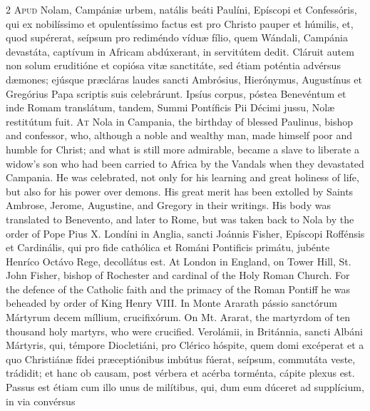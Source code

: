 \begin{paracol}{2}
\lettrine[lines=2]{A}{pud} Nolam, Campániæ 
 urbem, natális beáti Paulíni, Epíscopi et Confessóris, qui ex nobilíssimo et 
 opulentíssimo factus est pro Christo pauper et húmilis, et, quod supérerat, 
 seípsum pro rediméndo víduæ fílio, quem Wándali, Campánia devastáta, 
 captívum in Africam abdúxerant, in servitútem dedit. Cláruit autem non 
 solum eruditióne et copiósa vitæ sanctitáte, sed étiam poténtia advérsus 
 dæmones; ejúsque præcláras laudes sancti Ambrósius, Hierónymus, Augustínus 
 et Gregórius Papa scriptis suis celebrárunt. Ipsíus corpus, póstea 
 Benevéntum et inde Romam translátum, tandem, Summi Pontíficis Pii Décimi 
 jussu, Nolæ restitútum fuit.
\switchcolumn
{}
\lettrine[lines=2]{A}{t} Nola in Campania, the birthday of 
 blessed Paulinus, bishop and confessor, who, although a noble and wealthy 
 man, made himself poor and humble for Christ; and what is still more 
 admirable, became a slave to liberate a widow's son who had been carried to 
 Africa by the Vandals when they devastated Campania. He was 
 celebrated, not only for his learning and great holiness of life, but also 
 for his power over demons. His great merit has been extolled by Saints 
 Ambrose, Jerome, Augustine, and Gregory in their writings. His body 
 was translated to Benevento, and later to Rome, but was taken back to Nola 
 by the order of Pope Pius X.
\switchcolumn*
{}
Londíni in Anglia, 
 sancti Joánnis Fisher, Epíscopi Roffénsis et Cardinális, qui pro fide 
 cathólica et Románi Pontificis primátu, jubénte Henríco Octávo Rege, 
 decollátus est.
\switchcolumn
{}
At London in England, on Tower Hill, 
 St. John Fisher, bishop of Rochester and cardinal of the Holy Roman Church. 
 For the defence of the Catholic faith and the primacy of the Roman Pontiff 
 he was beheaded by order of King Henry VIII.
\switchcolumn*
{}
In Monte Ararath pássio 
 sanctórum Mártyrum decem míllium, crucifixórum.
\switchcolumn
{}
On Mt. Ararat, the martyrdom of ten 
 thousand holy martyrs, who were crucified.
\switchcolumn*
{}
Verolámii, in 
 Británnia, sancti Albáni Mártyris, qui, témpore Diocletiáni, pro Clérico 
 hóspite, quem domi excéperat et a quo Christiánæ fídei præceptiónibus 
 imbútus fúerat, seípsum, commutáta veste, trádidit; et hanc ob causam, post 
 vérbera et acérba torménta, cápite plexus est. Passus est étiam cum 
 illo unus de milítibus, qui, dum eum dúceret ad supplícium, in via convérsus 

\end{paracol}
